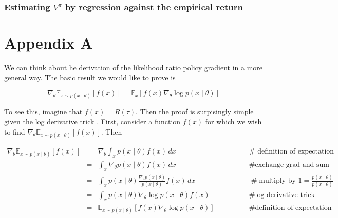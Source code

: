 \documentclass[11pt, oneside]{article}                          %
\begin{document}
\subsubsection{Estimating $V^{\pi}$ by regression against the empirical return}

\newpage
\section{Appendix A}
\label{appendix:a}
We can think about he derivation of the likelihood ratio policy
gradient in a more general way. The basic result we would like to
prove is
 
\begin{equation*}
\nabla_{\theta} \mathbb{E}_{x \sim p(x \mid \theta)} [f(x)] 
		= \mathbb{E}_{x} [f(x) \nabla_{\theta} \log p(x  \mid  \theta)]
\end{equation*}

\bigskip
\noindent
To see this, imagine that $f(x) = R(\tau)$.
Then the proof is surpisingly simple given the log derivative
trick \cite{log_derivative_trick}. First, consider a function
$f(x)$ for which we wish to find $\nabla_{\theta} \mathbb{E}_{x
\sim p(x \mid \theta)} [f(x)]$. Then

%
%
\begin{equation*}
\begin{array}{llll}
\nabla_{\theta} \mathbb{E}_{x \sim p(x \mid \theta)} [f(x)] 
&=& {\displaystyle \nabla_{\theta} \int_x p(x \mid \theta) f(x) \, dx}  
		&\qquad \qquad \mathbin{\#} \text{ definition of expectation} \\
[15pt]
&=& {\displaystyle \int_x \nabla_{\theta} p(x \mid \theta) f(x) \, dx}
		&\qquad \qquad \mathrel{\#} \text{exchange grad and sum} \\
[15pt]
&=& {\displaystyle \int_x p(x \mid \theta) 
		\frac{\nabla_{\theta} p(x \mid \theta)} {p(x \mid \theta)} f(x) \, dx}  
		&\qquad \qquad \mathrel{\#} \text{multiply by } 1 = \frac{p(x \mid \theta)}{p(x \mid \theta)} \\
[15pt]
&=& {\displaystyle \int_x p(x \mid \theta)  \nabla_{\theta} \log{p(x \mid \theta)} f(x)} 
		&\qquad \qquad \mathrel{\#} \text{log derivative trick} \\
[15pt]
&=& \mathbb{E}_{x \sim p(x \mid \theta)} [f(x) \nabla_{\theta} \log{p(x \mid \theta)}] 
		&\qquad \qquad \mathrel{\#} \text{definition of expectation} 
\end{array}
\end{equation*}
\end{document}
